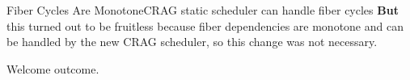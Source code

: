 






\begin{frame}{Fiber Cycles Are Monotone}{CRAG static scheduler can handle fiber cycles}
    \textbf{But} this turned out to be \alert{fruitless} because fiber dependencies are \alert{monotone} and can be handled by the new CRAG scheduler, so this change was not necessary. 

\newlinevspace
Welcome outcome.
    
\end{frame}

